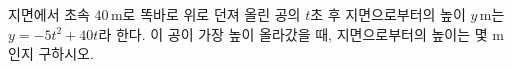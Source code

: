 지면에서 초속 $40\,\mathrm{m}$로 똑바로 위로 던져 올린 공의 $t$초 후 지면으로부터의 높이 $y\,\mathrm{m}$는 $y=-5t^2+40t$라 한다. 이 공이 가장 높이 올라갔을 때, 지면으로부터의 높이는 몇 $\mathrm{m}$인지 구하시오.
